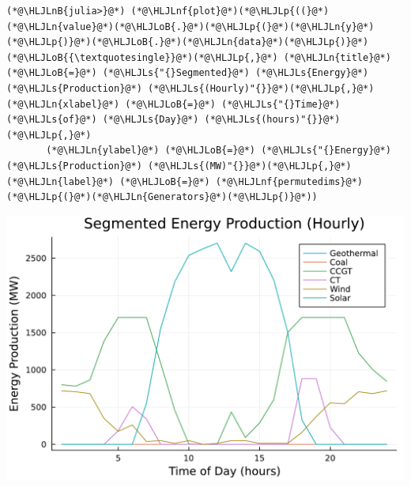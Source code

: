 \documentclass[12pt,a4paper]{article}
\newcommand{\HLJLn}[1]{#1}
\newcommand{\HLJLnf}[1]{\textcolor[RGB]{66,102,213}{#1}}
\newcommand{\HLJLs}[1]{\textcolor[RGB]{201,61,57}{#1}}
\newcommand{\HLJLnB}[1]{\textcolor[RGB]{59,151,46}{#1}}
\newcommand{\HLJLoB}[1]{\textcolor[RGB]{102,102,102}{\textbf{#1}}}
\newcommand{\HLJLp}[1]{#1}
\begin{document}
\begin{lstlisting}
(*@\HLJLnB{julia>}@*) (*@\HLJLnf{plot}@*)(*@\HLJLp{((}@*)(*@\HLJLn{value}@*)(*@\HLJLoB{.}@*)(*@\HLJLp{(}@*)(*@\HLJLn{y}@*)(*@\HLJLp{)}@*)(*@\HLJLoB{.}@*)(*@\HLJLn{data}@*)(*@\HLJLp{)}@*)(*@\HLJLoB{{\textquotesingle}}@*)(*@\HLJLp{,}@*) (*@\HLJLn{title}@*) (*@\HLJLoB{=}@*) (*@\HLJLs{"{}Segmented}@*) (*@\HLJLs{Energy}@*) (*@\HLJLs{Production}@*) (*@\HLJLs{(Hourly)"{}}@*)(*@\HLJLp{,}@*) (*@\HLJLn{xlabel}@*) (*@\HLJLoB{=}@*) (*@\HLJLs{"{}Time}@*) (*@\HLJLs{of}@*) (*@\HLJLs{Day}@*) (*@\HLJLs{(hours)"{}}@*)(*@\HLJLp{,}@*)
       (*@\HLJLn{ylabel}@*) (*@\HLJLoB{=}@*) (*@\HLJLs{"{}Energy}@*) (*@\HLJLs{Production}@*) (*@\HLJLs{(MW)"{}}@*)(*@\HLJLp{,}@*) (*@\HLJLn{label}@*) (*@\HLJLoB{=}@*) (*@\HLJLnf{permutedims}@*)(*@\HLJLp{(}@*)(*@\HLJLn{Generators}@*)(*@\HLJLp{)}@*))
\end{lstlisting}
\includegraphics[width=\linewidth]{figures/solution-template_6_1.pdf}
\end{document}
